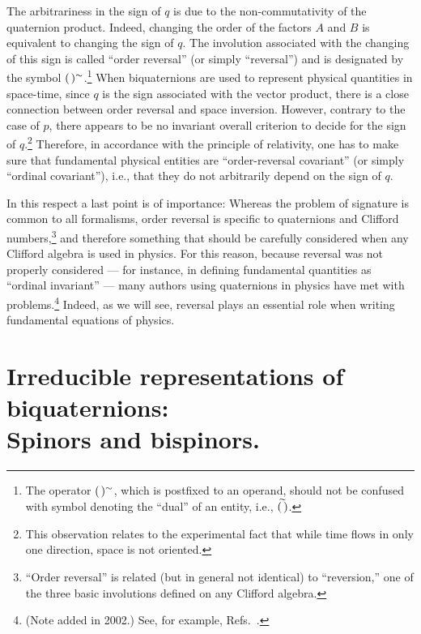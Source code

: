 \documentclass [12pt,a4paper      ]{article}
\newcommand{\A}{(\hspace{.5mm})} %
\newcommand{\REV}{\sim}               %
\newcommand{\DUA}{\widetilde}         %
\begin{document}
     The  arbitrariness in the sign of $q$ is due to the non-commutativity  
of the quaternion product.   Indeed,  changing the 
order  of the factors $A$ and $B$ is equivalent to changing the  sign 
of $q$.   The involution associated with the changing  of 
this sign is called ``order reversal'' (or simply ``reversal'') and is designated by the symbol $\A^\REV$.\footnote{The operator $\A^\REV$, which is postfixed to an operand, should not be confused with symbol denoting the ``dual'' of an entity, i.e., $\DUA{\A}$.} When biquaternions are used to represent 
physical quantities in space-time, since $q$ is the sign associated 
with  the  vector product,  there is a close  connection  between 
order reversal and space inversion. However, contrary to the 
case of $p$,  there appears to be no invariant overall criterion to 
decide for the sign of $q$.\footnote{This observation relates to the experimental fact that while time flows in only one direction, space is not oriented.}  Therefore,  in accordance  with  the 
principle  of relativity,  one has to make sure that  fundamental 
physical entities are ``order-reversal covariant'' (or simply ``ordinal covariant''), i.e., that they do not arbitrarily depend on the sign of $q$.

     In  this respect a last point is of importance:  Whereas the 
problem  of  signature  is  common  to all formalisms,  order reversal 
is  specific  to  quaternions and Clifford numbers,\footnote{``Order reversal'' is related (but in general not identical) to ``reversion,'' one of the three basic involutions defined on any Clifford algebra.}  and  therefore 
something that should be carefully considered when  any  Clifford 
algebra  is  used  in  physics.  For  this  reason,  because 
reversal was  not  properly  considered  --- for  instance,   in 
defining fundamental quantities as ``ordinal invariant'' --- many 
authors  using  quaternions  in physics have met  with  problems.\footnote{(Note added in 2002.) See, for example, Refs.~\cite{R60,R61}.}  
Indeed,  as  we  will  see,  reversal  plays  an 
essential role when writing fundamental equations of physics.


\section{Irreducible representations of biquaternions:\\ Spinors and bispinors.}
\label{irr:0}
\end{document}
